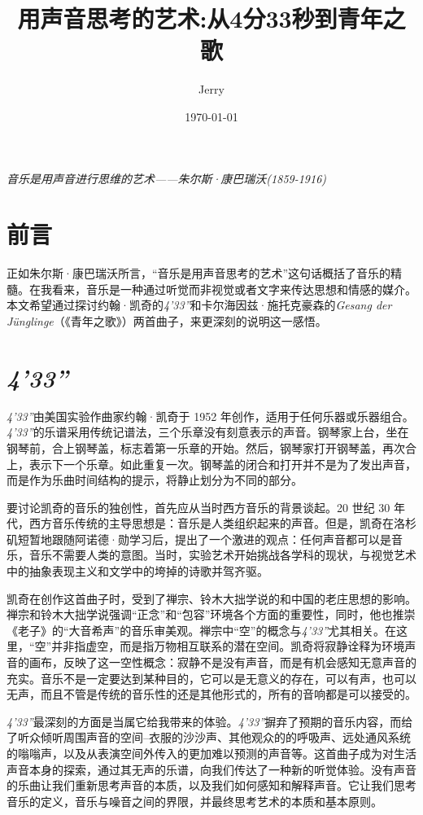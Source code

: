 \documentclass{article}
\title{\bf\huge 用声音思考的艺术:从4分33秒到青年之歌}
\author{Jerry}
\date{\today}
\begin{document}
\fancyfoot[C]{\thepage}

\maketitle

\emph{音乐是用声音进行思维的艺术——朱尔斯·康巴瑞沃(1859-1916)}

\section{前言}

正如朱尔斯·康巴瑞沃所言，“音乐是用声音思考的艺术”这句话概括了音乐的精髓。在我看来，音乐是一种通过听觉而非视觉或者文字来传达思想和情感的媒介。本文希望通过探讨约翰·凯奇的\emph{4'33''}和卡尔海因兹·施托克豪森的\emph{Gesang der Jünglinge}（《青年之歌》）两首曲子，来更深刻的说明这一感悟。

\section{\emph{4'33''}}

\emph{4'33''}由美国实验作曲家约翰·凯奇于 1952 年创作，适用于任何乐器或乐器组合。\emph{4'33''}的乐谱采用传统记谱法，三个乐章没有刻意表示的声音。钢琴家上台，坐在钢琴前，合上钢琴盖，标志着第一乐章的开始。然后，钢琴家打开钢琴盖，再次合上，表示下一个乐章。如此重复一次。钢琴盖的闭合和打开并不是为了发出声音，而是作为乐曲时间结构的提示，将静止划分为不同的部分。\cite{4'33''}

要讨论凯奇的音乐的独创性，首先应从当时西方音乐的背景谈起。20 世纪 30 年代，西方音乐传统的主导思想是：音乐是人类组织起来的声音。但是，凯奇在洛杉矶短暂地跟随阿诺德·勋学习后，提出了一个激进的观点：任何声音都可以是音乐，音乐不需要人类的意图。当时，实验艺术开始挑战各学科的现状，与视觉艺术中的抽象表现主义和文学中的垮掉的诗歌并驾齐驱。

凯奇在创作这首曲子时，受到了禅宗、铃木大拙学说的和中国的老庄思想的影响。禅宗和铃木大拙学说强调“正念”和“包容”环境各个方面的重要性，同时，他也推崇《老子》的“大音希声”的音乐审美观。禅宗中“空”的概念与\emph{4'33''}尤其相关。在这里，“空”并非指虚空，而是指万物相互联系的潜在空间。凯奇将寂静诠释为环境声音的画布，反映了这一空性概念：寂静不是没有声音，而是有机会感知无意声音的充实。音乐不是一定要达到某种目的，它可以是无意义的存在，可以有声，也可以无声，而且不管是传统的音乐性的还是其他形式的，所有的音响都是可以接受的。

\emph{4'33''}最深刻的方面是当属它给我带来的体验。\emph{4'33''}摒弃了预期的音乐内容，而给了听众倾听周围声音的空间--衣服的沙沙声、其他观众的的呼吸声、远处通风系统的嗡嗡声，以及从表演空间外传入的更加难以预测的声音等。这首曲子成为对生活声音本身的探索，通过其无声的乐谱，向我们传达了一种新的听觉体验。没有声音的乐曲让我们重新思考声音的本质，以及我们如何感知和解释声音。它让我们思考音乐的定义，音乐与噪音之间的界限，并最终思考艺术的本质和基本原则。
\end{document}
